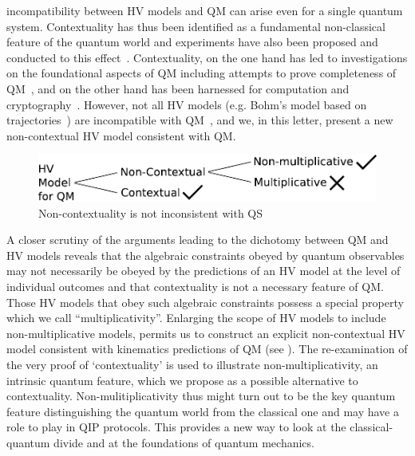 \documentclass[british,aps,prl,superscriptaddress,nofootinbib,times,reprint]{revtex4-1}
\theoremstyle{plain}
\theoremstyle{plain}
\theoremstyle{definition}
\theoremstyle{remark}
\theoremstyle{remark}
\theoremstyle{remark}
\theoremstyle{plain}
\theoremstyle{plain}
\theoremstyle{plain}
\theoremstyle{definition}
\theoremstyle{definition}
\begin{document}
incompatibility between HV models and QM can arise
even for a single quantum system.  Contextuality
has thus been identified as a fundamental
non-classical feature of the quantum world and
experiments have also been proposed and conducted
to this effect~\cite{SimonContExpProp,
HuangContExp}.
Contextuality, on the one hand has
led to investigations on the foundational aspects
of QM including attempts to prove completeness of
QM~\cite{PawelCntxClsscl,CabelloMmryQM}, and on
the other hand has been harnessed for computation
and
cryptography~\cite{HowardCntxCmptn,CabelloCntxScrt}.
However, not all HV models (e.g.
Bohm's model based on
trajectories~\cite{Bohm1,Bohm2}) are incompatible
with QM~\cite{BellOnHiddenVariables}, and we, in
this letter, present a new non-contextual HV model
consistent with QM.
\begin{figure}[h]
\includegraphics[width=0.9\columnwidth]{block1}
\caption{Non-contextuality is not inconsistent
with QS} \label{fig:block}\end{figure}
A closer scrutiny of the arguments
leading to the dichotomy between QM and HV models
reveals that the algebraic constraints obeyed by
quantum observables may not necessarily be obeyed
by the predictions of an HV model at the level of
individual outcomes and  that contextuality is 
not a necessary feature of QM.  Those HV
models that obey such algebraic constraints
possess a special property which we call
``multiplicativity''.  Enlarging the scope of HV
models to include non-multiplicative models,
permits us to construct an explicit non-contextual
HV model consistent with 
kinematics predictions of
QM (see ).
The re-examination of the very proof of
`contextuality'  is used to illustrate
non-multiplicativity, an intrinsic quantum
feature, which we propose as a possible
alternative to contextuality. 
Non-mulitiplicativity thus might turn out to be
the key quantum feature distinguishing the quantum
world from the classical one and may have a role
to play in QIP protocols.  This provides a new
way to look at the classical-quantum divide and at
the foundations of quantum mechanics. 
\end{document}
